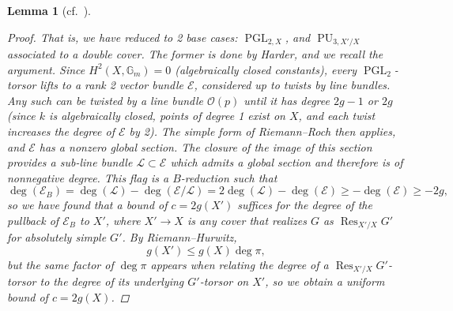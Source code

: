 \documentclass[openany]{amsbook}
\newtheorem{lemma}[theorem]{Lemma}
\theoremstyle{definition}
\theoremstyle{remark}
\numberwithin{equation}{section}
\newcommand{\G}{\mathbb{G}}
\renewcommand{\O}{\mathcal{O}}
\newcommand{\cL}{\mathcal{L}}
\newcommand{\cE}{\mathcal{E}}
\renewcommand{\-}{\operatorname{-}}
\newcommand{\PGL}{\operatorname{PGL}}
\newcommand{\on}[1]{\operatorname{#1}}
\begin{document}
\begin{lemma}[{{cf.\ \cite[Prop. 6.1.6]{CLI}}}]
\begin{proof}
        That is, we have reduced to 2 base cases: $\on{PGL}_{2,X}$, and $\on{PU}_{3, X'/X}$ associated to a double cover. The former is done by Harder, and we recall the argument. Since $H^2(X, \G_m) = 0$ (algebraically closed constants), every $\PGL_2$-torsor lifts to a rank 2 vector bundle $\cE$, considered up to twists by line bundles. Any such can be twisted by a line bundle $\O(p)$ until it has degree $2g-1$ or $2g$ (since $k$ is algebraically closed, points of degree 1 exist on $X$, and each twist increases the degree of $\cE$ by 2). The simple form of Riemann--Roch then applies, and $\cE$ has a nonzero global section. The closure of the image of this section provides a sub-line bundle $\cL \subset \cE$ which admits a global section and therefore is of nonnegative degree. This flag is a $B$-reduction such that
        $$
            \deg(\cE_B) = \deg(\cL) - \deg(\cE/\cL) = 2\deg(\cL) - \deg(\cE) \ge -\deg(\cE) \ge -2g,
        $$
        so we have found that a bound of $c = 2g(X')$ suffices for the degree of the pullback of $\cE_B$ to $X'$, where $X' \to X$ is any cover that realizes $G$ as $\on{Res}_{X'/X} G'$ for absolutely simple $G'$. By Riemann--Hurwitz, 
        $$
            g(X') \le g(X)\deg \pi,
        $$
        but the same factor of $\deg \pi$ appears when relating the degree of a $\on{Res}_{X'/X} G'$-torsor to the degree of its underlying $G'$-torsor on $X'$, so we obtain a uniform bound of $c = 2g(X)$.


\end{proof}
\end{lemma}
\end{document}
